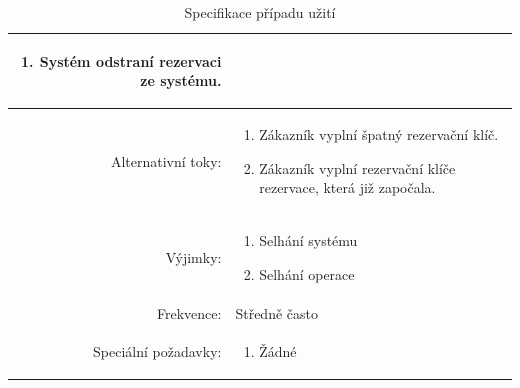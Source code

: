 \begin{table}[ht!]
{\begin{tabular}{| r | p{12cm} |}
\begin{minipage}[t]{0.75\textwidth}
\begin{enumerate}[nosep,after=\strut]
            \item Systém odstraní rezervaci ze systému. 
    	\end{enumerate}
  	\end{minipage} \\
    \hline
    Alternativní toky: & 
    \begin{minipage}[t]{0.75\textwidth}
    	\begin{enumerate}[nosep,after=\strut]
            \item Zákazník vyplní špatný rezervační klíč.
            \item Zákazník vyplní rezervační klíče rezervace, která již započala.
    	\end{enumerate}
  	\end{minipage} \\
    \hline
    Výjimky: & 
    \begin{minipage}[t]{0.75\textwidth}
    	\begin{enumerate}[nosep,after=\strut]
    		\item Selhání systému
    		\item Selhání operace
    	\end{enumerate}
  	\end{minipage} \\
    \hline
    Frekvence: & Středně často \\
    \hline
    Speciální požadavky: & 
    \begin{minipage}[t]{0.75\textwidth}
    	\begin{enumerate}[nosep,after=\strut]
    		\item Žádné
    	\end{enumerate}
  	\end{minipage} \\
    \hline

\end{tabular}}
\caption{Specifikace případu užití }
\label{table:1}
\end{table}


